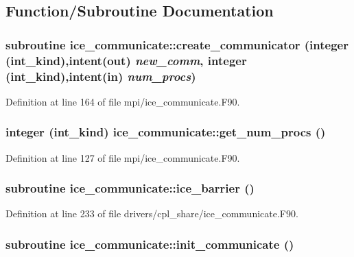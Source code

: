 \subsection{Function/Subroutine Documentation}
\hypertarget{namespaceice__communicate_ad2adaa21b7db32dd0153db9ab8053403}{
\subsubsection[{create\_\-communicator}]{\setlength{\rightskip}{0pt plus 5cm}subroutine ice\_\-communicate::create\_\-communicator (integer (int\_\-kind),intent(out) {\em new\_\-comm}, \/  integer (int\_\-kind),intent(in) {\em num\_\-procs})}}
\label{namespaceice__communicate_ad2adaa21b7db32dd0153db9ab8053403}


Definition at line 164 of file mpi/ice\_\-communicate.F90.\hypertarget{namespaceice__communicate_a770f142bf42a8d6877c33aa88ee083a8}{
\subsubsection[{get\_\-num\_\-procs}]{\setlength{\rightskip}{0pt plus 5cm}integer (int\_\-kind) ice\_\-communicate::get\_\-num\_\-procs ()}}
\label{namespaceice__communicate_a770f142bf42a8d6877c33aa88ee083a8}


Definition at line 127 of file mpi/ice\_\-communicate.F90.\hypertarget{namespaceice__communicate_adcaef4ea8733bb0217c377f794b1fd4c}{
\subsubsection[{ice\_\-barrier}]{\setlength{\rightskip}{0pt plus 5cm}subroutine ice\_\-communicate::ice\_\-barrier ()}}
\label{namespaceice__communicate_adcaef4ea8733bb0217c377f794b1fd4c}


Definition at line 233 of file drivers/cpl\_\-share/ice\_\-communicate.F90.\hypertarget{namespaceice__communicate_adbf0aa130556f1968ab2b21de96d9ac1}{
\subsubsection[{init\_\-communicate}]{\setlength{\rightskip}{0pt plus 5cm}subroutine ice\_\-communicate::init\_\-communicate ()}}
\label{namespaceice__communicate_adbf0aa130556f1968ab2b21de96d9ac1}


